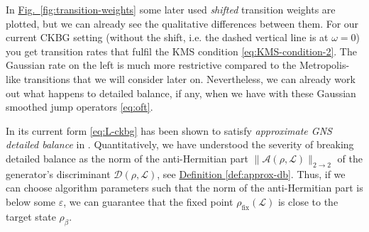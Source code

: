 In \hyperref[fig:transition-weights]{Fig.~\ref*{fig:transition-weights}} some later used \emph{shifted} transition weights are plotted, but we can already see the qualitative differences between them. For our current CKBG setting (without the shift, i.e. the dashed vertical line is at $\omega = 0$) you get transition rates that fulfil the KMS condition \eqref{eq:KMS-condition-2}. The Gaussian rate on the left is much more restrictive compared to the Metropolis-like transitions that we will consider later on. Nevertheless, we can already work out what happens to  detailed balance, if any, when we have with these Gaussian smoothed jump operators \eqref{eq:oft}. 

In its current form \eqref{eq:L-ckbg} has been shown to satisfy \textit{approximate GNS detailed balance} in \cite{chen2023quantum}. Quantitatively, we have understood the severity of breaking detailed balance as the norm of the anti-Hermitian part $\|\mathcal{A}(\rho, \mathcal{L})\|_{2\rightarrow 2}$ of the generator's discriminant $\mathcal{D}(\rho, \mathcal{L})$, see \hyperref[def:approx-db]{Definition \ref*{def:approx-db}}. Thus, if we can choose algorithm parameters such that the norm of the anti-Hermitian part is below some $\varepsilon$, we can guarantee that the fixed point $\rho_\text{fix}(\mathcal{L})$ is close to the target state $\rho_\beta$.


